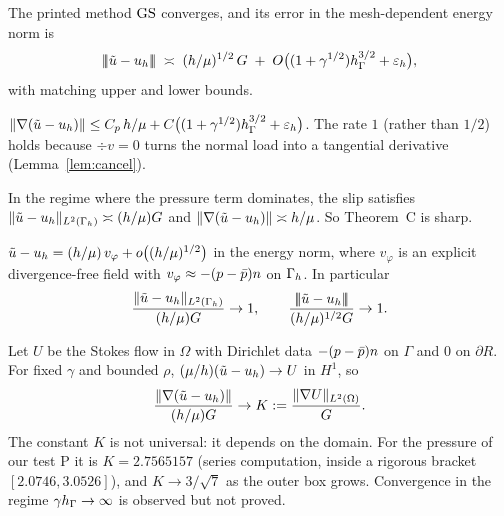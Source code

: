 \begin{theoremA}
The printed method $\mathrm{GS}$ converges, and its error in the mesh-dependent energy norm is
\[
|\!|\!|\tilde u-u_h|\!|\!|\;\asymp\;(h/\mu)^{1/2}\,G\;+\;O\bigl((1+\gamma^{1/2})h_\Gamma^{3/2}+\varepsilon_h\bigr),
\]
with matching upper and lower bounds.
\end{theoremA}

\begin{theoremC}
$\lVert \nabla(\tilde u-u_h)\rVert\le C_p\,h/\mu+C\bigl((1+\gamma^{1/2})h_\Gamma^{3/2}+\varepsilon_h\bigr)$.
The rate $1$ (rather than $1/2$) holds because $\div v=0$ turns the normal load into a tangential derivative (Lemma~\ref{lem:cancel}).
\end{theoremC}

\begin{theoremB}
In the regime where the pressure term dominates, the slip satisfies $\lVert \tilde u-u_h\rVert_{L^2(\Gamma_h)}\asymp (h/\mu)G$ and $\lVert \nabla(\tilde u-u_h)\rVert\asymp h/\mu$. So Theorem~C is sharp.
\end{theoremB}

\begin{corollaryBp}
$\tilde u-u_h=(h/\mu)\,v_\varphi+o\bigl((h/\mu)^{1/2}\bigr)$ in the energy norm, where $v_\varphi$ is an explicit divergence-free field with $v_\varphi\approx-(p-\bar p)n$ on $\Gamma_h$. In particular
\[
\frac{\lVert \tilde u-u_h\rVert_{L^2(\Gamma_h)}}{(h/\mu)G}\to1,
\qquad
\frac{|\!|\!|\tilde u-u_h|\!|\!|}{(h/\mu)^{1/2}G}\to1.
\]
\end{corollaryBp}

\begin{theoremBpp}
Let $U$ be the Stokes flow in $\Omega$ with Dirichlet data $-(p-\bar p)n$ on $\Gamma$ and $0$ on $\partial R$. For fixed $\gamma$ and bounded $\rho$, $(\mu/h)(\tilde u-u_h)\to U$ in $H^1$, so
\[
\frac{\lVert \nabla(\tilde u-u_h)\rVert}{(h/\mu)G}\to K:=\frac{\lVert \nabla U\rVert_{L^2(\Omega)}}{G}.
\]
The constant $K$ is not universal: it depends on the domain. For the pressure of our test P it is $K=2.7565157$ (series computation, inside a rigorous bracket $[2.0746,3.0526]$), and $K\to3/\sqrt7$ as the outer box grows. Convergence in the regime $\gamma h_\Gamma\to\infty$ is observed but not proved.
\end{theoremBpp}


